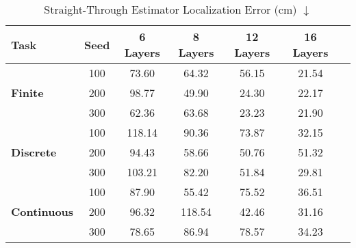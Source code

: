 
\begin{table}[h]
\centering
\begin{tabular}{lcccccc}
\toprule
\textbf{Task}       & \textbf{Seed} & \textbf{6 Layers} & \textbf{8 Layers} & \textbf{12 Layers} & \textbf{16 Layers} \\ 
\midrule
\multirow{3}{*}{\textbf{Finite}}     
                    & 100           & 73.60             & 64.32             & 56.15              & 21.54              \\
                    & 200           & 98.77             & 49.90             & 24.30              & 22.17              \\
                    & 300           & 62.36             & 63.68             & 23.23              & 21.90              \\ 
\midrule
\multirow{3}{*}{\textbf{Discrete}}   
                    & 100           & 118.14            & 90.36             & 73.87              & 32.15              \\
                    & 200           & 94.43             & 58.66             & 50.76              & 51.32              \\
                    & 300           & 103.21            & 82.20             & 51.84              & 29.81              \\ 
\midrule
\multirow{3}{*}{\textbf{Continuous}} 
                    & 100           & 87.90             & 55.42             & 75.52              & 36.51              \\
                    & 200           & 96.32             & 118.54            & 42.46              & 31.16              \\
                    & 300           & 78.65             & 86.94             & 78.57              & 34.23              \\ 
\bottomrule
\end{tabular}
\caption{Straight-Through Estimator Localization Error (cm) $\downarrow$}
\label{tab:st_full_loc}
\end{table}


